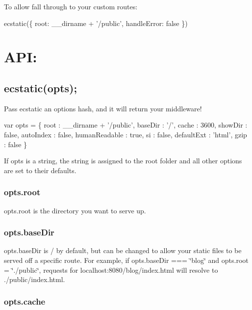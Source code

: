 To allow fall through to your custom routes\+:


\begin{DoxyCode}
ecstatic(\{ root: \_\_dirname + '/public', handleError: false \})
\end{DoxyCode}


\section*{A\+PI\+:}

\subsection*{ecstatic(opts);}

Pass ecstatic an options hash, and it will return your middleware!


\begin{DoxyCode}
var opts = \{
             root          : \_\_dirname + '/public',
             baseDir       : '/',
             cache         : 3600,
             showDir       : false,
             autoIndex     : false,
             humanReadable : true,
             si            : false,
             defaultExt    : 'html',
             gzip          : false
           \}
\end{DoxyCode}


If {\ttfamily opts} is a string, the string is assigned to the root folder and all other options are set to their defaults.

\subsubsection*{{\ttfamily opts.\+root}}

{\ttfamily opts.\+root} is the directory you want to serve up.

\subsubsection*{{\ttfamily opts.\+base\+Dir}}

{\ttfamily opts.\+base\+Dir} is {\ttfamily /} by default, but can be changed to allow your static files to be served off a specific route. For example, if {\ttfamily opts.\+base\+Dir === \char`\"{}blog\char`\"{}} and {\ttfamily opts.\+root = \char`\"{}./public\char`\"{}}, requests for {\ttfamily localhost\+:8080/blog/index.\+html} will resolve to {\ttfamily ./public/index.html}.

\subsubsection*{{\ttfamily opts.\+cache}}

